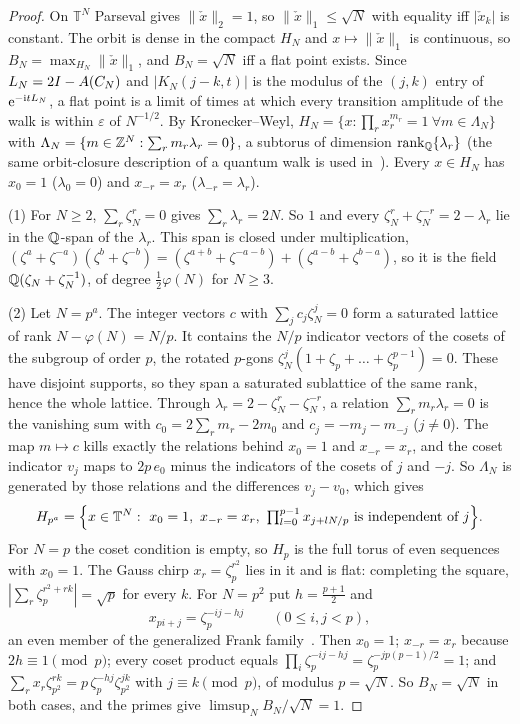 \begin{proof}
On $\mathbb T^N$ Parseval gives $\|\check x\|_2=1$, so $\|\check x\|_1\le\sqrt N$ with equality iff $|\check x_k|$
is constant. The orbit is dense in the compact $H_N$ and $x\mapsto\|\check x\|_1$ is continuous, so
$B_N=\max_{H_N}\|\check x\|_1$, and $B_N=\sqrt N$ iff a flat point exists. Since $L_N=2I-A(C_N)$ and
$|K_N(j-k,t)|$ is the modulus of the $(j,k)$ entry of $\mathrm{e}^{-\mathrm itL_N}$, a flat point is a limit of times at
which every transition amplitude of the walk is within $\varepsilon$ of $N^{-1/2}$. By Kronecker--Weyl,
$H_N=\{x:\prod_rx_r^{m_r}=1\ \forall m\in\Lambda_N\}$ with $\Lambda_N=\{m\in\mathbb{Z}^N:\sum_rm_r\lambda_r=0\}$, a
subtorus of dimension $\operatorname{rank}_{\mathbb{Q}}\{\lambda_r\}$ (the same orbit-closure description of a quantum walk is used
in~\cite{CBGSW}). Every $x\in H_N$ has $x_0=1$ ($\lambda_0=0$) and
$x_{-r}=x_r$ ($\lambda_{-r}=\lambda_r$).

(1) For $N\ge2$, $\sum_r\zeta_N^r=0$ gives $\sum_r\lambda_r=2N$. So $1$ and every
$\zeta_N^r+\zeta_N^{-r}=2-\lambda_r$ lie in the $\mathbb{Q}$-span of the $\lambda_r$. This span is closed under
multiplication, $(\zeta^a+\zeta^{-a})(\zeta^b+\zeta^{-b})=(\zeta^{a+b}+\zeta^{-a-b})+(\zeta^{a-b}+\zeta^{b-a})$, so it
is the field $\mathbb{Q}(\zeta_N+\zeta_N^{-1})$, of degree $\tfrac12\varphi(N)$ for $N\ge3$.

(2) Let $N=p^a$. The integer vectors $c$ with $\sum_jc_j\zeta_N^j=0$ form a saturated lattice of rank
$N-\varphi(N)=N/p$. It contains the $N/p$ indicator vectors of the cosets of the subgroup of order $p$, the
rotated $p$-gons $\zeta_N^j(1+\zeta_p+\dots+\zeta_p^{p-1})=0$. These have disjoint supports, so they span a
saturated sublattice of the same rank, hence the whole lattice. Through
$\lambda_r=2-\zeta_N^r-\zeta_N^{-r}$, a relation $\sum_rm_r\lambda_r=0$ is the vanishing sum with
$c_0=2\sum_rm_r-2m_0$ and $c_j=-m_j-m_{-j}$ ($j\ne0$). The map $m\mapsto c$ kills exactly the relations
behind $x_0=1$ and $x_{-r}=x_r$, and the coset indicator $v_j$ maps to $2p\,e_0$ minus the indicators of the
cosets of $j$ and $-j$. So $\Lambda_N$ is generated by those relations and the differences $v_j-v_0$, which gives
\[
  H_{p^a}=\Bigl\{x\in\mathbb T^N:\ x_0=1,\ x_{-r}=x_r,\ \textstyle\prod_{l=0}^{p-1}x_{j+lN/p}
  \ \text{is independent of } j\Bigr\}.
\]
For $N=p$ the coset condition is empty, so $H_p$ is the full torus of even sequences with $x_0=1$. The Gauss
chirp $x_r=\zeta_p^{r^2}$ lies in it and is flat: completing the square, $|\sum_r\zeta_p^{r^2+rk}|=\sqrt p$ for
every $k$. For $N=p^2$ put $h=\tfrac{p+1}2$ and
\[
  x_{pi+j}=\zeta_p^{-ij-hj}\qquad(0\le i,j<p),
\]
an even member of the generalized Frank family~\cite{FrankZadoff,KSW}. Then $x_0=1$; $x_{-r}=x_r$ because
$2h\equiv1\pmod p$; every coset product equals $\prod_i\zeta_p^{-ij-hj}=\zeta_p^{-jp(p-1)/2}=1$; and
$\sum_rx_r\zeta_{p^2}^{rk}=p\,\zeta_p^{-hj}\zeta_{p^2}^{jk}$ with $j\equiv k\pmod p$, of modulus $p=\sqrt N$. So
$B_N=\sqrt N$ in both cases, and the primes give $\limsup_NB_N/\sqrt N=1$.


\end{proof}
